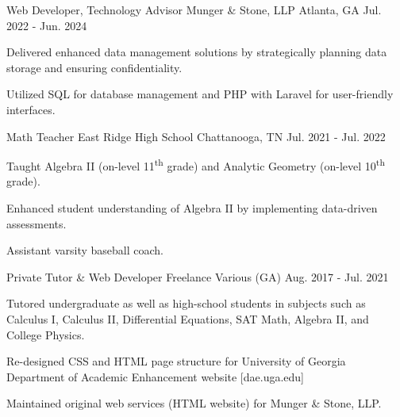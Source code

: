 

\begin{cventries}

  \cventry
    {Web Developer, Technology Advisor} %
    {Munger \& Stone, LLP} %
    {Atlanta, GA} %
    {Jul. 2022 - Jun. 2024} %
    {
    	\begin{cvitems} %
    		\item {Delivered enhanced data management solutions by strategically planning data storage and ensuring confidentiality.}
    		\item {Utilized SQL for database management and PHP with Laravel for user-friendly interfaces.}
       	\end{cvitems}
    }
    
\vspace{6mm}

  \cventry
    {Math Teacher} %
    {East Ridge High School} %
    {Chattanooga, TN} %
    {Jul. 2021 - Jul. 2022} %
    {
      \begin{cvitems} %
        \item {Taught Algebra II (on-level 11\textsuperscript{th} grade) and Analytic Geometry (on-level 10\textsuperscript{th} grade).}
        \item {Enhanced student understanding of Algebra II by implementing data-driven assessments.}
        \item {Assistant varsity baseball coach.}
      \end{cvitems}
    }
    
\vspace{6mm}
	
   \cventry
	{Private Tutor \& Web Developer} %
	{Freelance} %
	{Various (GA)} %
	{Aug. 2017 - Jul. 2021} %
	{
		\begin{cvitems} %
			\item {Tutored undergraduate as well as high-school students in subjects such as Calculus I, Calculus II, Differential Equations, SAT Math, Algebra II, and College Physics.}
			\item {Re-designed CSS and HTML page structure for University of Georgia Department of Academic Enhancement website [dae.uga.edu]}
			\item {Maintained original web services (HTML website) for Munger \& Stone, LLP.}
		\end{cvitems}
	}


\end{cventries}
